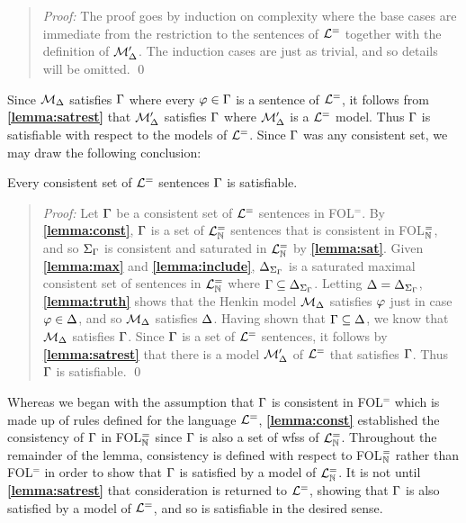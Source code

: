 \begin{quote} 
  \textit{Proof:} The proof goes by induction on complexity where the base cases are immediate from the restriction to the sentences of $\mathcal{L}^{=}$ together with the definition of $\mathcal{M}'_{\Delta}$.
  The induction cases are just as trivial, and so details will be omitted.
  \qed
\end{quote}

Since $\mathcal{M}_{\Delta}$ satisfies $\Gamma$ where every $\varphi\in\Gamma$ is a sentence of $\mathcal{L}^{=}$, it follows from \textbf{\ref{lemma:satrest}} that $\mathcal{M}'_{\Delta}$ satisfies $\Gamma$ where $\mathcal{M}'_{\Delta}$ is a $\mathcal{L}^{=}$ model. 
Thus $\Gamma$ is satisfiable with respect to the models of $\mathcal{L}^{=}$.
Since $\Gamma$ was any consistent set, we may draw the following conclusion:

  \begin{Tthm} \label{thm:comp}
    Every consistent set of $\mathcal{L}^{=}$ sentences $\Gamma$ is satisfiable. 
  \end{Tthm}

\begin{quote} 
  \textit{Proof:} 
  Let $\Gamma$ be a consistent set of $\mathcal{L}^{=}$ sentences in FOL$^=$.
  By \textbf{\ref{lemma:const}}, $\Gamma$ is a set of $\mathcal{L}^{=}_{\mathbb{N}}$ sentences that is consistent in FOL$^=_{\mathbb{N}}$, and so $\Sigma_{\Gamma}$ is consistent and saturated in $\mathcal{L}^{=}_{\mathbb{N}}$ by \textbf{\ref{lemma:sat}}. 
  Given \textbf{\ref{lemma:max}} and \textbf{\ref{lemma:include}}, $\Delta_{\Sigma_{\Gamma}}$ is a saturated maximal consistent set of sentences in $\mathcal{L}^{=}_{\mathbb{N}}$ where $\Gamma\subseteq\Delta_{\Sigma_{\Gamma}}$.
  Letting $\Delta=\Delta_{\Sigma_{\Gamma}}$, \textbf{\ref{lemma:truth}} shows that the Henkin model $\mathcal{M}_{\Delta}$ satisfies $\varphi$ just in case $\varphi\in\Delta$, and so $\mathcal{M}_{\Delta}$ satisfies $\Delta$.
  Having shown that $\Gamma\subseteq\Delta$, we know that $\mathcal{M}_{\Delta}$ satisfies $\Gamma$.
  Since $\Gamma$ is a set of $\mathcal{L}^{=}$ sentences, it follows by \textbf{\ref{lemma:satrest}} that there is a model $\mathcal{M}'_{\Delta}$ of $\mathcal{L}^{=}$ that satisfies $\Gamma$.
  Thus $\Gamma$ is satisfiable.
  \qed
\end{quote}

Whereas we began with the assumption that $\Gamma$ is consistent in FOL$^=$ which is made up of rules defined for the language $\mathcal{L}^{=}$, \textbf{\ref{lemma:const}} established the consistency of $\Gamma$ in FOL$^=_{\mathbb{N}}$ since $\Gamma$ is also a set of wfss of $\mathcal{L}^{=}_{\mathbb{N}}$.
Throughout the remainder of the lemma, consistency is defined with respect to FOL$^=_{\mathbb{N}}$ rather than FOL$^=$ in order to show that $\Gamma$ is satisfied by a model of $\mathcal{L}^{=}_{\mathbb{N}}$. 
It is not until \textbf{\ref{lemma:satrest}} that consideration is returned to $\mathcal{L}^{=}$, showing that $\Gamma$ is also satisfied by a model of $\mathcal{L}^{=}$, and so is satisfiable in the desired sense.

